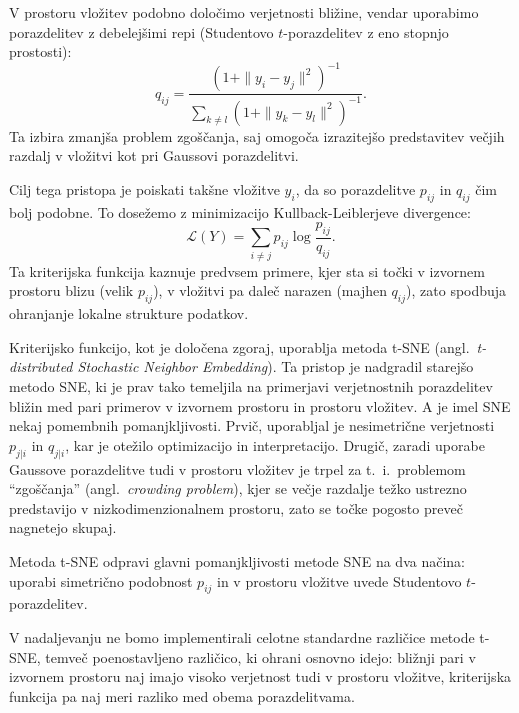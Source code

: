 V prostoru vložitev podobno določimo verjetnosti bližine, vendar uporabimo porazdelitev z debelejšimi repi (Studentovo $t$-porazdelitev z eno stopnjo prostosti):
\[
q_{ij} = \frac{\left(1 + \|y_i - y_j\|^2\right)^{-1}}{\sum_{k \ne l} \left(1 + \|y_k - y_l\|^2\right)^{-1}}.
\]
Ta izbira zmanjša problem zgoščanja, saj omogoča izrazitejšo predstavitev večjih razdalj v vložitvi kot pri Gaussovi porazdelitvi.

Cilj tega pristopa je poiskati takšne vložitve $y_i$, da so porazdelitve $p_{ij}$ in $q_{ij}$ čim bolj podobne. To dosežemo z minimizacijo Kullback-Leiblerjeve divergence:
\[
\mathcal{L}(Y) = \sum_{i \ne j} p_{ij} \log \frac{p_{ij}}{q_{ij}}.
\]
Ta kriterijska funkcija kaznuje predvsem primere, kjer sta si točki v izvornem prostoru blizu (velik $p_{ij}$), v vložitvi pa daleč narazen (majhen $q_{ij}$), zato spodbuja ohranjanje lokalne strukture podatkov.

Kriterijsko funkcijo,
%
%
kot je določena zgoraj, uporablja metoda t-SNE (angl.~\emph{t-distributed Stochastic Neighbor Embedding}). Ta pristop je nadgradil starejšo metodo SNE, ki je prav tako temeljila na primerjavi verjetnostnih porazdelitev bližin med pari primerov v izvornem prostoru in prostoru vložitev. A je imel SNE nekaj pomembnih pomanjkljivosti. Prvič, uporabljal je nesimetrične verjetnosti $p_{j|i}$ in $q_{j|i}$, kar je otežilo optimizacijo in interpretacijo. Drugič, zaradi uporabe Gaussove porazdelitve tudi v prostoru vložitev je trpel za t.~i.\ problemom ``zgoščanja'' (angl.~\emph{crowding problem}), kjer se večje razdalje težko ustrezno predstavijo v nizkodimenzionalnem prostoru, zato se točke pogosto preveč nagnetejo skupaj.

Metoda t-SNE odpravi glavni pomanjkljivosti metode SNE na dva načina: uporabi simetrično podobnost \( p_{ij} \) in v prostoru vložitve uvede Studentovo \( t \)-porazdelitev.

V nadaljevanju ne bomo implementirali celotne standardne različice metode t-SNE, temveč poenostavljeno različico, ki ohrani osnovno idejo: bližnji pari v izvornem prostoru naj imajo visoko verjetnost tudi v prostoru vložitve, kriterijska funkcija pa naj meri razliko med obema porazdelitvama. 

